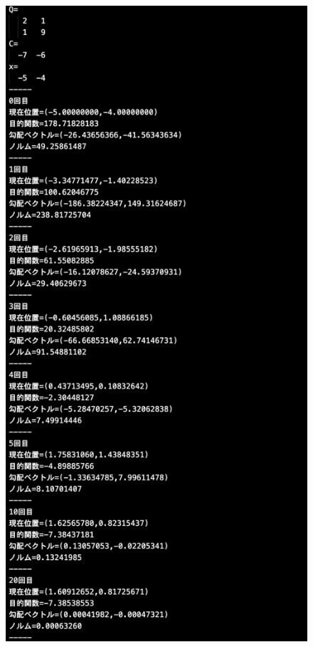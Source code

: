 \documentclass[12pt]{jarticle}
\begin{document}
\clearpage
\begin{figure}[h]
    \begin{center}
        \includegraphics[scale=0.2]{kadai1_1s_out3_2_1.png}
    \end{center}

\end{figure}
\end{document}

